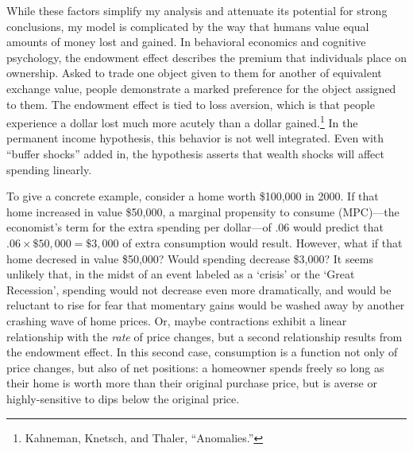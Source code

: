\documentclass[
]{article}
\begin{document}
While these factors simplify my analysis and attenuate its potential for strong conclusions, my model is complicated by the way that humans value equal amounts of money lost and gained.
In behavioral economics and cognitive psychology, the endowment effect describes the premium that individuals place on ownership.
Asked to trade one object given to them for another of equivalent exchange value, people demonstrate a marked preference for the object assigned to them.
The endowment effect is tied to loss aversion, which is that people experience a dollar lost much more acutely than a dollar gained.\footnote{Kahneman, Knetsch, and Thaler, ``Anomalies.''}
In the permanent income hypothesis, this behavior is not well integrated.
Even with ``buffer shocks'' added in, the hypothesis asserts that wealth shocks will affect spending linearly.

To give a concrete example, consider a home worth \$100,000 in 2000.
If that home increased in value \$50,000, a marginal propensity to consume (MPC)---the economist's term for the extra spending per dollar---of .06 would predict that \(.06 \times \$50,000 = \$3,000\) of extra consumption would result.
However, what if that home decresed in value \$50,000?
Would spending decrease \$3,000?
It seems unlikely that, in the midst of an event labeled as a `crisis' or the `Great Recession', spending would not decrease even more dramatically, and would be reluctant to rise for fear that momentary gains would be washed away by another crashing wave of home prices.
Or, maybe contractions exhibit a linear relationship with the \emph{rate} of price changes, but a second relationship results from the endowment effect.
In this second case, consumption is a function not only of price changes, but also of net positions: a homeowner spends freely so long as their home is worth more than their original purchase price, but is averse or highly-sensitive to dips below the original price.
\end{document}
